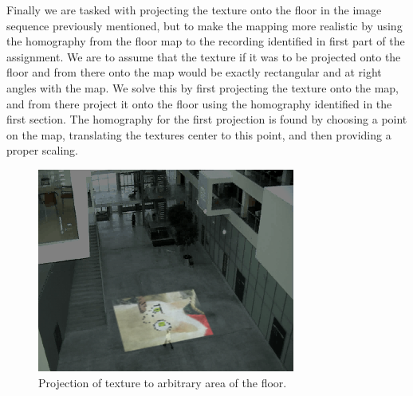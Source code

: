 Finally we are tasked with projecting the texture onto the floor in the image sequence previously mentioned, but to make the mapping more realistic by using the homography from the floor map to the recording identified in first part of the assignment. We are to assume that the texture if it was to be projected onto the floor and from there onto the map would be exactly rectangular and at right angles with the map. We solve this by first projecting the texture onto the map, and from there project it onto the floor using the homography identified in the first section. The homography for the first projection is found by choosing a point on the map, translating the textures center to this point, and then providing a proper scaling. 
\begin{figure}[h]
	\centering
	\includegraphics[scale=1]{images/texture_projection.png}
	\caption{Projection of texture to arbitrary area of the floor.}
\end{figure}

